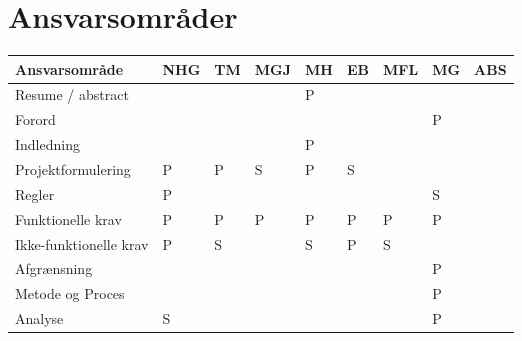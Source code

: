 \documentclass[Rapport/Rapport_main.tex]{subfiles}
\begin{document}
\section{Ansvarsområder}
\begin{longtable}{|L{0.2\textwidth}|L{0.082\textwidth}|L{0.08\textwidth}|L{0.08\textwidth}|L{0.08\textwidth}|L{0.08\textwidth}|L{0.08\textwidth}|L{0.08\textwidth}|L{0.08\textwidth}|}
        \hline
        \textbf{Ansvarsområde}  &\textbf{NHG}   &\textbf{TM}    &\textbf{MGJ}   &\textbf{MH}    &\textbf{EB}    & \textbf{MFL}  & \textbf{MG}   &\textbf{ABS}    \\ \hline
        Resume / abstract       &               &               &               &       P       &               &               &               &                \\ \hline
        Forord                  &               &               &               &               &               &               &       P       &                \\ \hline
        Indledning              &               &               &               &       P       &               &               &               &                \\ \hline
        Projektformulering      &       P       &       P       &       S       &       P       &       S       &               &               &                \\ \hline
        Regler                  &       P       &               &               &               &               &               &       S       &                \\ \hline
        Funktionelle krav       &       P       &       P       &       P       &       P       &       P       &       P       &       P       &                \\ \hline
        Ikke-funktionelle krav  &       P       &       S       &               &       S       &       P       &       S       &               &                \\ \hline
        Afgrænsning             &               &               &               &               &               &               &       P       &                \\ \hline
        Metode og Proces        &               &               &               &               &               &               &       P       &                \\ \hline
        Analyse                 &       S       &               &               &               &               &               &       P       &                \\ \hline

\end{longtable}
\end{document}
